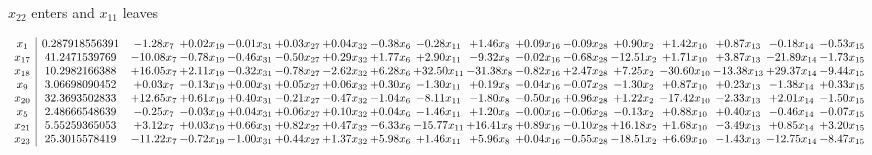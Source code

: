 \documentclass[9pt]{article}
\begin{document}
 $ x_{22} $ enters and $ x_{11} $ leaves 

 \[\begin{array}{c| c c@{\hskip 2pt} c@{\hskip 2pt} c@{\hskip 2pt} c@{\hskip 2pt} c@{\hskip 2pt} c@{\hskip 2pt} c@{\hskip 2pt} c@{\hskip 2pt} c@{\hskip 2pt} c@{\hskip 2pt} c@{\hskip 2pt} c@{\hskip 2pt} c@{\hskip 2pt} c@{\hskip 2pt} c@{\hskip 2pt} }
 x_{1}   &  0.287918556391 & -1.28 x_{7} & +  0.02 x_{19} & -0.01 x_{31} & +  0.03 x_{27} & +  0.04 x_{32} & -0.38 x_{6} & -0.28 x_{11} & +  1.46 x_{8} & +  0.09 x_{16} & -0.09 x_{28} & +  0.90 x_{2} & +  1.42 x_{10} & +  0.87 x_{13} & -0.18 x_{14} & -0.53 x_{15}\\
 x_{17}   &  41.2471539769 & -10.08 x_{7} & -0.78 x_{19} & -0.46 x_{31} & -0.50 x_{27} & +  0.29 x_{32} & +  1.77 x_{6} & +  2.90 x_{11} & -9.32 x_{8} & -0.02 x_{16} & -0.68 x_{28} & -12.51 x_{2} & +  1.71 x_{10} & +  3.87 x_{13} & -21.89 x_{14} & -1.73 x_{15}\\
 x_{18}   &  10.2982166388 & + 16.05 x_{7} & +  2.11 x_{19} & -0.32 x_{31} & -0.78 x_{27} & -2.62 x_{32} & +  6.28 x_{6} & + 32.50 x_{11} & -31.38 x_{8} & -0.82 x_{16} & +  2.47 x_{28} & +  7.25 x_{2} & -30.60 x_{10} & -13.38 x_{13} & + 29.37 x_{14} & -9.44 x_{15}\\
 x_{9}   &  3.06698090452 & +  0.03 x_{7} & -0.13 x_{19} & +  0.00 x_{31} & +  0.05 x_{27} & +  0.06 x_{32} & +  0.30 x_{6} & -1.30 x_{11} & +  0.19 x_{8} & -0.04 x_{16} & -0.07 x_{28} & -1.30 x_{2} & +  0.87 x_{10} & +  0.23 x_{13} & -1.38 x_{14} & +  0.33 x_{15}\\
 x_{20}   &  32.3693502833 & + 12.65 x_{7} & +  0.61 x_{19} & +  0.40 x_{31} & -0.21 x_{27} & -0.47 x_{32} & -1.04 x_{6} & -8.11 x_{11} & -1.80 x_{8} & -0.50 x_{16} & +  0.96 x_{28} & +  1.22 x_{2} & -17.42 x_{10} & -2.33 x_{13} & +  2.01 x_{14} & -1.50 x_{15}\\
 x_{5}   &  2.48666548639 & -0.25 x_{7} & -0.03 x_{19} & +  0.04 x_{31} & +  0.06 x_{27} & +  0.10 x_{32} & +  0.04 x_{6} & -1.46 x_{11} & +  1.20 x_{8} & -0.00 x_{16} & -0.06 x_{28} & -0.13 x_{2} & +  0.88 x_{10} & +  0.40 x_{13} & -0.46 x_{14} & -0.07 x_{15}\\
 x_{21}   &  5.55259365053 & +  3.12 x_{7} & +  0.03 x_{19} & +  0.66 x_{31} & +  0.82 x_{27} & +  0.47 x_{32} & -6.33 x_{6} & -15.77 x_{11} & + 16.41 x_{8} & +  0.89 x_{16} & -0.10 x_{28} & + 16.18 x_{2} & +  1.68 x_{10} & -3.49 x_{13} & +  0.85 x_{14} & +  3.20 x_{15}\\
 x_{23}   &  25.3015578419 & -11.22 x_{7} & -0.72 x_{19} & -1.00 x_{31} & +  0.44 x_{27} & +  1.37 x_{32} & +  5.98 x_{6} & +  1.46 x_{11} & +  5.96 x_{8} & +  0.04 x_{16} & -0.55 x_{28} & -18.51 x_{2} & +  6.69 x_{10} & -1.43 x_{13} & -12.75 x_{14} & -8.47 x_{15}\\

\end{array}\]
\end{document}
